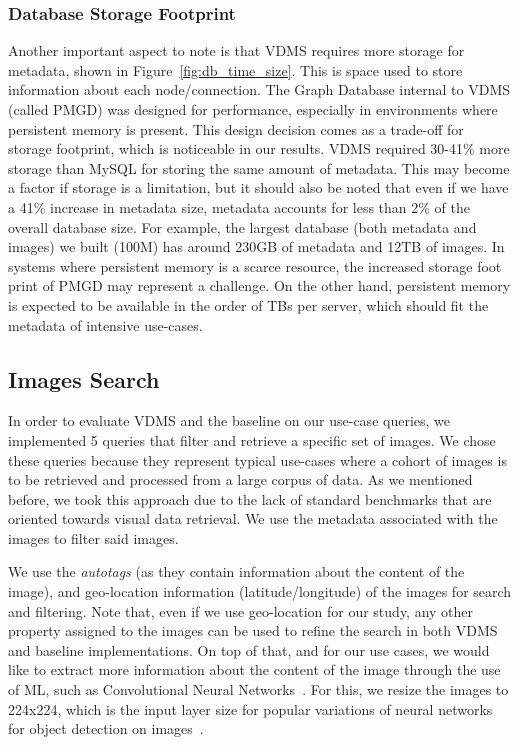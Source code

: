 \subsubsection{Database Storage Footprint}

Another important aspect to note is that
VDMS requires more storage for metadata, shown in Figure~\ref{fig:db_time_size}.
This is space used to store information about each node/connection.
The Graph Database internal to VDMS (called PMGD) was designed for performance,
especially in environments where persistent memory is present.
This design decision comes as a trade-off for storage footprint, which is
noticeable in our results.
VDMS required 30-41\% more storage than MySQL for storing the same amount
of metadata.
This may become a factor if storage is a limitation, but it should also be noted
that even if we have a 41\% increase in metadata size,
metadata accounts for less than 2\% of the overall database size.
For example, the largest database (both metadata and images) we built
(100M) has around 230GB of metadata and 12TB of images.
In systems where persistent memory is a scarce resource,
the increased storage foot print of PMGD may represent a challenge.
On the other hand, persistent memory is expected to be available
in the order of TBs per server, which should fit the
metadata of intensive use-cases\cite{IntelXPoint15}.


\subsection{Images Search}
\label{images}

In order to evaluate VDMS and the baseline on our use-case queries,
we implemented 5 queries that filter and retrieve a specific set of images.
We chose these queries because they represent typical use-cases where a
cohort of images is to be retrieved and processed from a large corpus of data.
As we mentioned before, we took this approach due to the lack of standard
benchmarks that are oriented towards visual data retrieval.
We use the metadata associated with the images to filter said images.

We use the \textit{autotags} (as they contain information about the content
of the image), and geo-location information (latitude/longitude)
of the images for search and filtering.
Note that, even if we use geo-location for our study, any other property
assigned to the images can be used to refine the search
in both VDMS and baseline implementations.
On top of that, and for our use cases, we would like to extract more information
about the content of the image through the use of ML,
such as Convolutional Neural Networks~\cite{cnn}.
For this, we resize the images to 224x224, which is the input layer size for
popular variations of neural networks for object detection on images~\cite{resnet}.


